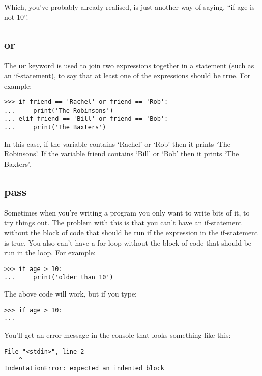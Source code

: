 \noindent
Which, you've probably already realised, is just another way of saying, ``if age is not 10''.

\subsection*{or}

The \textbf{or} keyword is used to join two expressions together in a statement (such as an if-statement), to say that at least one of the expressions should be true.  For example:

\begin{Verbatim}[frame=single]
>>> if friend == 'Rachel' or friend == 'Rob':
...     print('The Robinsons')
... elif friend == 'Bill' or friend == 'Bob':
...     print('The Baxters')
\end{Verbatim}

In this case, if the variable  contains `Rachel' or `Rob' then it prints `The Robinsons'.  If the variable friend contains `Bill' or `Bob' then it prints `The Baxters'.

\subsection*{pass}

Sometimes when you're writing a program you only want to write bits of it, to try things out.  The problem with this is that you can't have an if-statement without the block of code that should be run if the expression in the if-statement is true. You also can't have a for-loop without the block of code that should be run in the loop. For example:

\begin{Verbatim}[frame=single]
>>> if age > 10:
...     print('older than 10')
\end{Verbatim}

\noindent
The above code will work, but if you type:

\begin{Verbatim}[frame=single]
>>> if age > 10:
...
\end{Verbatim}

\noindent
You'll get an error message in the console that looks something like this:

\begin{Verbatim}[frame=single]
  File "<stdin>", line 2
    ^
IndentationError: expected an indented block
\end{Verbatim}

